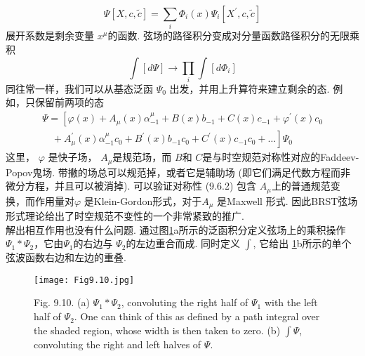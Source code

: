 \begin{equation}
	\Psi[X, c, \tilde{c}]=\sum_{i} \Phi_{i}(x) \Psi_{i}\left[X^{\prime}, c, \tilde{c}\right]
\end{equation}
展开系数是剩余变量 $x^{\mu}$的函数. 弦场的路径积分变成对分量函数路径积分的无限乘积
\begin{equation}
	\int[d \Psi] \rightarrow \prod_{i} \int\left[d \Phi_{i}\right]
\end{equation}
同往常一样，我们可以从基态泛函 $\Psi_{0}$ 出发，并用上升算符来建立剩余的态. 例如，只保留前两项的态
\begin{equation}
	\begin{array}{r}
		\Psi=\left[\varphi(x)+A_{\mu}(x) \alpha_{-1}^{\mu}+B(x) b_{-1}+C(x) c_{-1}+\varphi^{\prime}(x) c_{0}\right. \\
		\left.\quad+A_{\mu}^{\prime}(x) \alpha_{-1}^{\mu} c_{0}+B^{\prime}(x) b_{-1} c_{0}+C^{\prime}(x) c_{-1} c_{0}+\ldots\right] \Psi_{0}
	\end{array}
\end{equation}
这里， $\varphi$ 是快子场， $A_{\mu}$是规范场，而 $B$和 $C$是与时空规范对称性对应的Faddeev-Popov鬼场. 带撇的场总可以规范掉，或者它是辅助场 (即它们满足代数方程而非微分方程，并且可以被消掉). 可以验证对称性 (9.6.2) 包含 $A_{\mu}$上的普通规范变换，而作用量对$\varphi$ 是Klein-Gordon形式，对于$A_{\mu} $ 是Maxwell 形式. 因此BRST弦场形式理论给出了时空规范不变性的一个非常紧致的推广.\\
解出相互作用也没有什么问题. 通过图\ref{Fig9.10}a所示的泛函积分定义弦场上的乘积操作 $\Psi_{1} * \Psi_{2}$，它由$\Psi_{1}$的右边与 $\Psi_{2}$的左边重合而成. 同时定义 $\int$, 它给出 \ref{Fig9.10}b所示的单个弦波函数右边和左边的重叠. 

\begin{figure}
	\begin{center}
		\texttt{[image: Fig9.10.jpg]}\\
		\caption{Fig. 9.10. (a) $\Psi_{1} * \Psi_{2}$, convoluting the right half of $\Psi_{1}$ with the left half of $\Psi_{2}$. One can think of this as defined by a path integral over the shaded region, whose width is then taken to zero. (b) $\int \Psi$, convoluting the right and left halves of $\Psi$.}\label{Fig9.10}
	\end{center}
\end{figure}

